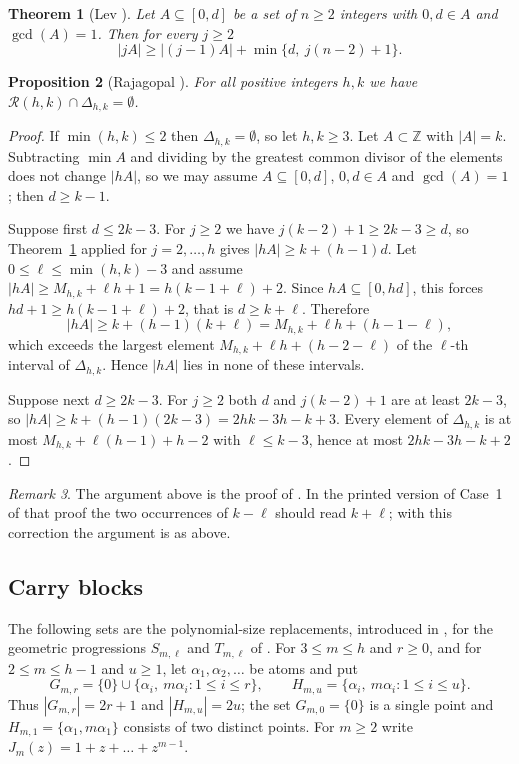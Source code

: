 \documentclass[11pt]{amsart}
\newtheorem{theorem}{Theorem}[section]
\newtheorem{proposition}[theorem]{Proposition}
\theoremstyle{definition}
\theoremstyle{remark}
\newtheorem{remark}[theorem]{Remark}
\numberwithin{equation}{section}
\newcommand{\Z}{\mathbb{Z}}
\newcommand{\R}{\mathcal{R}}
\begin{document}
\begin{theorem}[{Lev \cite[Theorem~1]{Lev96}}]\label{thm:lev}
Let $A\subseteq[0,d]$ be a set of $n\ge 2$ integers with $0,d\in A$ and $\gcd(A)=1$. Then for every $j\ge 2$
\[
|jA|\ge|(j-1)A|+\min\{d,\ j(n-2)+1\}.
\]
\end{theorem}

\begin{proposition}[{Rajagopal \cite[Theorem~1.3]{Raj26}}]\label{prop:exclusion}
For all positive integers $h,k$ we have $\R(h,k)\cap\Delta_{h,k}=\emptyset$.
\end{proposition}

\begin{proof}
If $\min(h,k)\le 2$ then $\Delta_{h,k}=\emptyset$, so let $h,k\ge 3$. Let $A\subset\Z$ with $|A|=k$. Subtracting $\min A$ and dividing by the greatest common divisor of the elements does not change $|hA|$, so we may assume $A\subseteq[0,d]$, $0,d\in A$ and $\gcd(A)=1$; then $d\ge k-1$.

Suppose first $d\le 2k-3$. For $j\ge 2$ we have $j(k-2)+1\ge 2k-3\ge d$, so Theorem~\ref{thm:lev} applied for $j=2,\dots,h$ gives $|hA|\ge k+(h-1)d$. Let $0\le\ell\le\min(h,k)-3$ and assume $|hA|\ge M_{h,k}+\ell h+1=h(k-1+\ell)+2$. Since $hA\subseteq[0,hd]$, this forces $hd+1\ge h(k-1+\ell)+2$, that is $d\ge k+\ell$. Therefore
\[
|hA|\ge k+(h-1)(k+\ell)=M_{h,k}+\ell h+(h-1-\ell),
\]
which exceeds the largest element $M_{h,k}+\ell h+(h-2-\ell)$ of the $\ell$-th interval of $\Delta_{h,k}$. Hence $|hA|$ lies in none of these intervals.

Suppose next $d\ge 2k-3$. For $j\ge 2$ both $d$ and $j(k-2)+1$ are at least $2k-3$, so $|hA|\ge k+(h-1)(2k-3)=2hk-3h-k+3$. Every element of $\Delta_{h,k}$ is at most $M_{h,k}+\ell(h-1)+h-2$ with $\ell\le k-3$, hence at most $2hk-3h-k+2$.
\end{proof}

\begin{remark}
The argument above is the proof of \cite[Theorem~1.3]{Raj26}. In the printed version of Case~1 of that proof the two occurrences of $k-\ell$ should read $k+\ell$; with this correction the argument is as above.
\end{remark}

\subsection{Carry blocks}
The following sets are the polynomial-size replacements, introduced in \cite[Section~3]{PC}, for the geometric progressions $S_{m,\ell}$ and $T_{m,\ell}$ of \cite[Definitions~4.14 and~4.16]{Raj26}. For $3\le m\le h$ and $r\ge 0$, and for $2\le m\le h-1$ and $u\ge 1$, let $\alpha_1,\alpha_2,\dots$ be atoms and put
\[
G_{m,r}=\{0\}\cup\{\alpha_i,\ m\alpha_i: 1\le i\le r\},\qquad H_{m,u}=\{\alpha_i,\ m\alpha_i: 1\le i\le u\}.
\]
Thus $|G_{m,r}|=2r+1$ and $|H_{m,u}|=2u$; the set $G_{m,0}=\{0\}$ is a single point and $H_{m,1}=\{\alpha_1,m\alpha_1\}$ consists of two distinct points. For $m\ge 2$ write $J_m(z)=1+z+\dots+z^{m-1}$.
\end{document}
